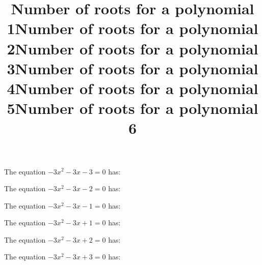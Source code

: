\documentclass{article}
\begin{document}
\begin{category}
\begin{question}[multichoice]
\title{Number of roots for a polynomial 1}
The equation $- 3 x^{2} - 3 x - 3=0$ has:


\end{question}
\begin{question}[multichoice]
\title{Number of roots for a polynomial 2}
The equation $- 3 x^{2} - 3 x - 2=0$ has:


\end{question}
\begin{question}[multichoice]
\title{Number of roots for a polynomial 3}
The equation $- 3 x^{2} - 3 x - 1=0$ has:


\end{question}
\begin{question}[multichoice]
\title{Number of roots for a polynomial 4}
The equation $- 3 x^{2} - 3 x + 1=0$ has:


\end{question}
\begin{question}[multichoice]
\title{Number of roots for a polynomial 5}
The equation $- 3 x^{2} - 3 x + 2=0$ has:


\end{question}
\begin{question}[multichoice]
\title{Number of roots for a polynomial 6}
The equation $- 3 x^{2} - 3 x + 3=0$ has:



\end{question}
\end{category}
\end{document}

